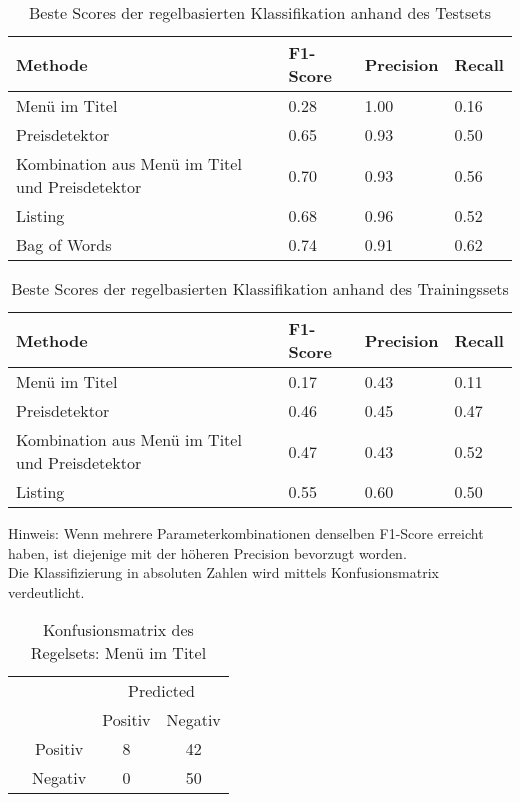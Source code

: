 \begin{table}[H]
	\caption{Beste Scores der regelbasierten Klassifikation anhand des Testsets}
	\centering
	\begin{tabular}{|l|l|l|l|}
		\hline
		Methode & F1-Score & Precision & Recall\\
		\hline
		Menü im Titel & 0.28 & 1.00 & 0.16 \\
		Preisdetektor & 0.65 & 0.93 & 0.50 \\
		Kombination aus Menü im Titel und Preisdetektor & 0.70 & 0.93 & 0.56\\
		Listing & 0.68 & 0.96 & 0.52\\
		Bag of Words & 0.74 & 0.91 & 0.62\\
		\hline
	\end{tabular}
\end{table}
\begin{table}[H]
	\caption{Beste Scores der regelbasierten Klassifikation anhand des Trainingssets}
	\label{tab:rulebased_train}
	\centering
	\begin{tabular}{|l|l|l|l|}
		\hline
		Methode & F1-Score & Precision & Recall\\
		\hline
		Menü im Titel & 0.17 & 0.43 & 0.11 \\
		Preisdetektor & 0.46 & 0.45 & 0.47 \\
		Kombination aus Menü im Titel und Preisdetektor & 0.47 & 0.43 & 0.52\\
		Listing & 0.55 & 0.60 & 0.50\\
		\hline
	\end{tabular}
\end{table}


Hinweis: Wenn mehrere Parameterkombinationen denselben F1-Score erreicht haben, ist diejenige mit der höheren Precision bevorzugt worden.\\
Die Klassifizierung in absoluten Zahlen wird mittels Konfusionsmatrix verdeutlicht.
\begin{table}[H]
	\caption{Konfusionsmatrix des Regelsets: Menü im Titel}
	\centering
\begin{tabular}{@{}cc|cc@{}}
	\multicolumn{1}{c}{} &\multicolumn{1}{c}{} &\multicolumn{2}{c}{Predicted} \\ 
	\multicolumn{1}{c}{} & 
	\multicolumn{1}{c|}{} & 
	\multicolumn{1}{c}{Positiv} & 
	\multicolumn{1}{c}{Negativ} \\ 
	\cline{2-4}
	\multirow[c]{2}{*}{\rotatebox[origin=tr]{90}{Actual}}
	& Positiv  & 8   & 42   \\[1.5ex]
	& Negativ  & 0   & 50 \\ 
	\cline{2-4}
\end{tabular}
\end{table}

